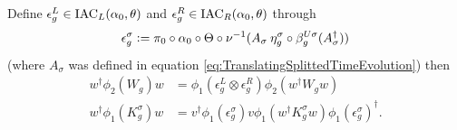\documentclass[12pt,a4paper,twoside]{article}
\numberwithin{equation}{section}
\begin{document}
\begin{lemma}
	Define $\epsilon^L_g\in\textrm{IAC}_L(\alpha_0,\theta)$ and $\epsilon^R_g\in\textrm{IAC}_R(\alpha_0,\theta)$ through
	\begin{align}
		\epsilon_g^\sigma\vcentcolon= \pi_0\circ\alpha_0\circ\Theta\circ\nu^{-1}(A_\sigma\:\eta_g^\sigma\circ\beta_{g}^{U\sigma}(A_\sigma^\dagger))
	\end{align}
	(where $A_\sigma$ was defined in equation \ref{eq:TranslatingSplittedTimeEvolution}) then
	\begin{align}
		w^\dagger \phi_2(W_g)w &= \phi_1(\epsilon_g^L\otimes\epsilon_g^R)\phi_2(w^\dagger W_g w)\\
		\label{eq:TransformationOfKUnderEpsilon}
		w^\dagger \phi_1(K_g^\sigma)w&=v^\dagger\phi_1(\epsilon_g^\sigma)v\phi_1(w^\dagger K_g^\sigma w)\phi_1(\epsilon_g^\sigma)^\dagger.
	\end{align}
\end{lemma}
\end{document}
